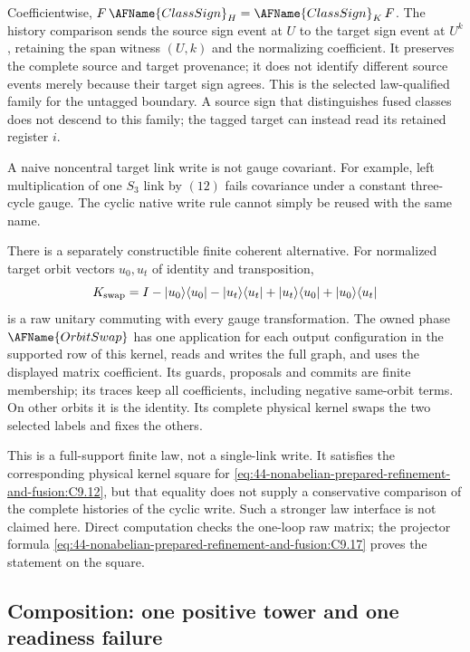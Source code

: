 Coefficientwise, $F\,\AFName{ClassSign}_H=\AFName{ClassSign}_K\,F$.  The
history comparison sends the source sign event at $U$ to the target sign event
at $U^k$, retaining the span witness $(U,k)$ and the normalizing coefficient.
It preserves the complete source and target provenance; it does not identify
different source events merely because their target sign agrees.  This is the
selected law-qualified family for the untagged boundary.  A source sign that
distinguishes fused classes does not descend to this family; the tagged target
can instead read its retained register $i$.

A naive noncentral target link write is not gauge covariant.  For example,
left multiplication of one $S_3$ link by $(12)$ fails covariance under a
constant three-cycle gauge.  The cyclic native write rule cannot simply be
reused with the same name.

There is a separately constructible finite coherent alternative.  For
normalized target orbit vectors $u_0,u_t$ of identity and transposition,
\begin{equation}
K_{\rm swap}=I-|u_0\rangle\langle u_0|-|u_t\rangle\langle u_t|
       +|u_t\rangle\langle u_0|+|u_0\rangle\langle u_t|
 \label{eq:44-nonabelian-prepared-refinement-and-fusion:C9.17}
\end{equation}
is a raw unitary commuting with every gauge transformation.  The owned phase
$\AFName{OrbitSwap}$ has one application for each output configuration in the
supported row of this kernel, reads and writes the full graph, and uses the
displayed matrix coefficient.  Its guards, proposals and commits are finite
membership; its traces keep all coefficients, including negative same-orbit
terms.  On other orbits it is the identity.  Its complete physical kernel swaps
the two selected labels and fixes the others.

This is a full-support finite law, not a single-link write.  It satisfies the
corresponding physical kernel square for
\eqref{eq:44-nonabelian-prepared-refinement-and-fusion:C9.12}, but that
equality does not supply a conservative comparison of the complete histories
of the cyclic write.  Such a stronger law interface is not claimed here.
Direct computation checks the one-loop raw matrix; the projector formula
\eqref{eq:44-nonabelian-prepared-refinement-and-fusion:C9.17} proves the
statement on the square.

\subsection{Composition: one positive tower and one readiness failure}\label{md:44-nonabelian-prepared-refinement-and-fusion:composition-one-positive-tower-and-one-real-readiness-failure}

